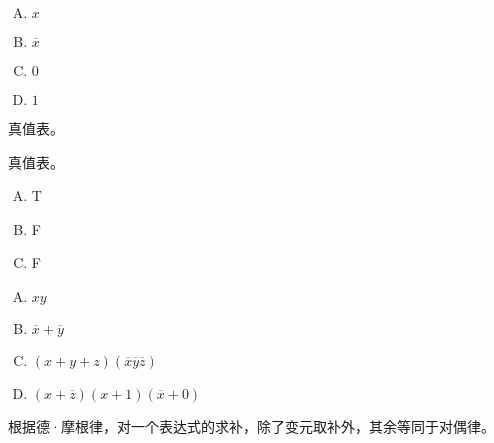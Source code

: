 {{        %
        \begin{practices}

        \end{practices}

        \begin{practices}
            \begin{enumerate}[A.]
                \item $x$
                \item $\overline{x}$
                \item $0$
                \item $1$
            \end{enumerate}
        \end{practices}

        \begin{practices}
            真值表。
        \end{practices}

        \begin{practices}
            真值表。
        \end{practices}

        \begin{practices}
            \begin{enumerate}[A.]
                \item T
                \item F
                \item F
            \end{enumerate}
        \end{practices}

        \begin{practices}
            \begin{enumerate}[A.]
                \item $xy$
                \item $\overline{x} + \overline{y}$
                \item $(x + y + z)(\overline{x}\overline{y}\overline{z})$
                \item $(x + \overline{z})(x + 1)(\overline{x} + 0)$
            \end{enumerate}
        \end{practices}

        \begin{practices}
            根据德·摩根律，对一个表达式的求补，除了变元取补外，其余等同于对偶律。
        \end{practices}

}}
